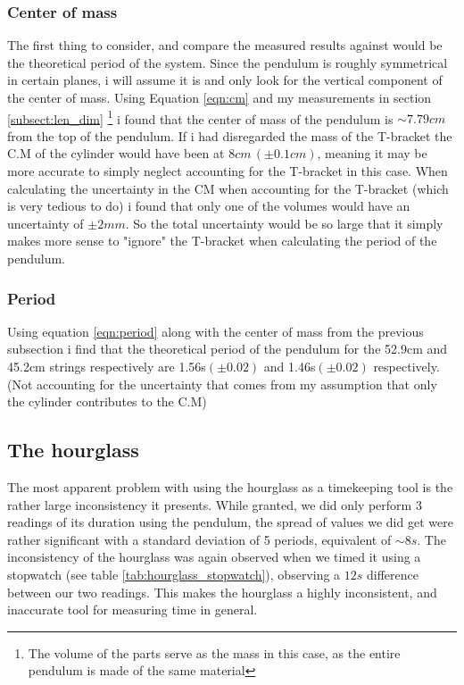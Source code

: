 \documentclass[%
 reprint,
 amsmath,amssymb,
 aps,
]{revtex4-1}
\begin{document}
		\subsubsection{Center of mass}
		The first thing to consider, and compare the measured results against would be the theoretical period of the system. Since the pendulum is roughly symmetrical in certain planes, i will assume it is and only look for the vertical component of the center of mass. Using Equation \ref{eqn:cm} and my measurements in section \ref{subsect:len_dim} \footnote{The volume of the parts serve as the mass in this case, as the entire pendulum is made of the same material} i found that the center of mass of the pendulum is $\sim 7.79cm$ from the top of the pendulum. If i had disregarded the mass of the T-bracket the C.M of the cylinder would have been at $8cm\,(\pm0.1cm)$, meaning it may be more accurate to simply neglect accounting for the T-bracket in this case. When calculating the uncertainty in the CM when accounting for the T-bracket (which is very tedious to do) i found that only one of the volumes would have an uncertainty of $\pm 2mm$. So the total uncertainty would be so large that it simply makes more sense to "ignore" the T-bracket when calculating the period of the pendulum.	
		\subsubsection{Period}
		Using equation \ref{eqn:period} along with the center of mass from the previous subsection i find that the theoretical period of the pendulum for the 52.9cm and 45.2cm strings respectively are 1.56s$(\pm 0.02)$ and 1.46s$(\pm 0.02)$ respectively. (Not accounting for the uncertainty that comes from my assumption that only the cylinder contributes to the C.M)

	\subsection{The hourglass}
		The most apparent problem with using the hourglass as a timekeeping tool is the rather large inconsistency it presents. While granted, we did only perform 3 readings of its duration using the pendulum, the spread of values we did get were rather significant with a standard deviation of 5 periods, equivalent of $\sim 8s$. The inconsistency of the hourglass was again observed when we timed it using a stopwatch (see table \ref{tab:hourglass_stopwatch}), observing a $12s$ difference between our two readings. This makes the hourglass a highly inconsistent, and inaccurate tool for measuring time in general.
\end{document}
